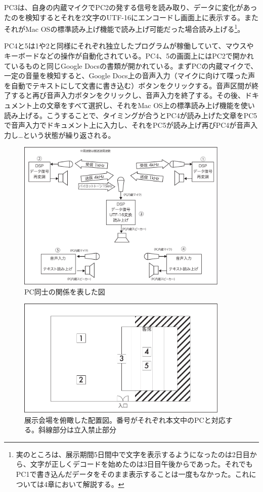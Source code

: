 \documentclass[a4paper,report]{jsbook}
\begin{document}
PC3は、自身の内蔵マイクでPC2の発する信号を読み取り、データに変化があったのを検知するとそれを2文字のUTF-16にエンコードし画面上に表示する。またそれがMac
OSの標準読み上げ機能で読み上げ可能だった場合読み上げる\footnote{実のところは、展示期間5日間中で文字を表示するようになったのは2日目から、文字が正しくデコードを始めたのは3日目午後からであった。それでもPC1で書き込んだデータをそのまま表示することは一度もなかった。これについては4章において解説する。}。

PC4と5は1や2と同様にそれぞれ独立したプログラムが稼働していて、マウスやキーボードなどの操作が自動化されている。PC4、5の画面上にはPC2で開かれているものと同じGoogle
Docsの書類が開かれている。まずPCの内蔵マイクで、一定の音量を検知すると、Google
Docs上の音声入力（マイクに向けて喋った声を自動でテキストにして文書に書き込む）ボタンをクリックする。音声区間が終了すると再び音声入力ボタンをクリックし、音声入力を終了する。その後、ドキュメント上の文章をすべて選択し、それをMac
OS上の標準読み上げ機能を使い読み上げる。こうすることで、タイミングが合うとPC4が読み上げた文章をPC5で音声入力でドキュメント上に入力し、それをPC5が読み上げ再びPC4が音声入力し\ldots{}という状態が繰り返される。

\begin{figure}[htbp]
\centering
\includegraphics[width=0.90000\textwidth]{./img/adm2_setsumei.pdf}
\caption{PC同士の関係を表した図\label{fig:setsumei}}
\end{figure}

\begin{figure}[htbp]
\centering
\includegraphics[width=0.90000\textwidth]{./img/place.pdf}
\caption{展示会場を俯瞰した配置図。番号がそれぞれ本文中のPCと対応する。斜線部分は立入禁止部分\label{fig:fukan}}
\end{figure}
\end{document}
